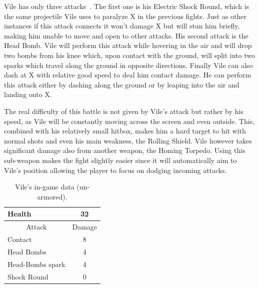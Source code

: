 Vile has only three attacks~\cite{wiki:Vile}. The first one is his Electric Shock Round, which is the same projectile Vile uses to paralyze X in the previous fights. Just as other instances if this attack connects it won't damage X but will stun him briefly, making him unable to move and open to other attacks. His second attack is the Head Bomb. Vile will perform this attack while hovering in the air and will drop two bombs from his knee which, upon contact with the ground, will split into two sparks which travel along the ground in opposite directions. Finally Vile can also dash at X with relative good speed to deal him contact damage. He can perform this attack either by dashing along the ground or by leaping into the air and landing onto X.

The real difficulty of this battle is not given by Vile's attack but rather by his speed, as Vile will be constantly moving across the screen and even outside. This, combined with his relatively small hitbox, makes him a hard target to hit with normal shots and even his main weakness, the Rolling Shield. Vile however takes significant damage also from another weapon, the Homing Torpedo. Using this sub-weapon makes the fight slightly easier since it will automatically aim to Vile's position allowing the player to focus on dodging incoming attacks.
\begin{table}
	\centering
	\begin{tabular}[htp]{l c}
		\toprule
		Health  & 32\\
		\midrule
		\multicolumn{1}{c}{Attack} & \multicolumn{1}{c}{Damage}\\
		Contact & 8\\
		Head Bombs & 4\\
		Head-Bombs spark & 4\\
		Shock Round & 0\\
		\bottomrule
	\end{tabular}
	\caption{Vile's in-game data (un-armored). }
\end{table}

